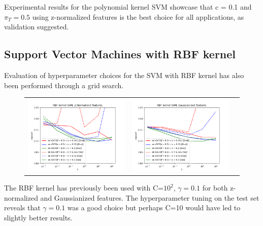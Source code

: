 \documentclass[12pt,a4paper]{article}
\begin{document}
\vspace{20pt}
Experimental results for the polynomial kernel SVM showcase that c = 0.1 and $\pi_T = 0.5$ using z-normalized features is the best choice for all applications, as validation suggested.
\clearpage

\subsection{Support Vector Machines with RBF kernel}

Evaluation of hyperparameter choices for the SVM with RBF kernel has also been performed through a grid search.

\begin{figure}[H]
    \begin{center}
        \hspace*{-15pt}
        \begin{tabular}{ccc}
            \includegraphics[width = 200pt]{img/evaluation_plots/evaluation-rbf-svm-z-normalized.png} &
            \includegraphics[width = 200pt]{img/evaluation_plots/evaluation-rbf-svm-gaussianized.png} &
        \end{tabular}
    \end{center}
\end{figure}

\vspace{-15pt}
The RBF kernel has previously been used with C=$10^2$, $\gamma=0.1$ for both z-normalized and Gaussianized features.
The hyperparameter tuning on the test set reveals that $\gamma=0.1$ was a good choice but perhaps C=10 would have led to slightly better results. \\
\end{document}
